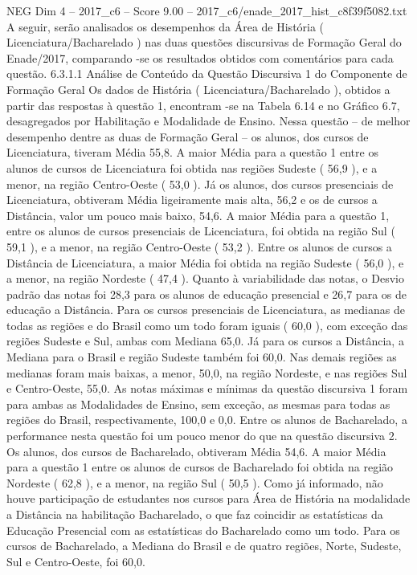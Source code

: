 \begin{textsample}{NEG Dim 4 – 2017\_c6 – Score 9.00 – 2017\_c6/enade\_2017\_hist\_c8f39f5082.txt}
A seguir, serão analisados os desempenhos da Área de História ( Licenciatura/Bacharelado ) nas duas questões discursivas de Formação Geral do Enade/2017, comparando -se os resultados obtidos com comentários para cada questão. 6.3.1.1 Análise de Conteúdo da Questão Discursiva 1 do Componente de Formação Geral Os dados de História ( Licenciatura/Bacharelado ), obtidos a partir das respostas à questão 1, encontram -se na Tabela 6.14 e no Gráfico 6.7, desagregados por Habilitação e Modalidade de Ensino.
Nessa questão – de melhor desempenho dentre as duas de Formação Geral – os alunos, dos cursos de Licenciatura, tiveram Média 55,8.
A maior Média para a questão 1 entre os alunos de cursos de Licenciatura foi obtida nas regiões Sudeste ( 56,9 ), e a menor, na região Centro-Oeste ( 53,0 ).
Já os alunos, dos cursos presenciais de Licenciatura, obtiveram Média ligeiramente mais alta, 56,2 e os de cursos a Distância, valor um pouco mais baixo, 54,6.
A maior Média para a questão 1, entre os alunos de cursos presenciais de Licenciatura, foi obtida na região Sul ( 59,1 ), e a menor, na região Centro-Oeste ( 53,2 ).
Entre os alunos de cursos a Distância de Licenciatura, a maior Média foi obtida na região Sudeste ( 56,0 ), e a menor, na região Nordeste ( 47,4 ).
Quanto à variabilidade das notas, o Desvio padrão das notas foi 28,3 para os alunos de educação presencial e 26,7 para os de educação a Distância.
Para os cursos presenciais de Licenciatura, as medianas de todas as regiões e do Brasil como um todo foram iguais ( 60,0 ), com exceção das regiões Sudeste e Sul, ambas com Mediana 65,0.
Já para os cursos a Distância, a Mediana para o Brasil e região Sudeste também foi 60,0.
Nas demais regiões as medianas foram mais baixas, a menor, 50,0, na região Nordeste, e nas regiões Sul e Centro-Oeste, 55,0.
As notas máximas e mínimas da questão discursiva 1 foram para ambas as Modalidades de Ensino, sem exceção, as mesmas para todas as regiões do Brasil, respectivamente, 100,0 e 0,0.
Entre os alunos de Bacharelado, a performance nesta questão foi um pouco menor do que na questão discursiva 2.
Os alunos, dos cursos de Bacharelado, obtiveram Média 54,6.
A maior Média para a questão 1 entre os alunos de cursos de Bacharelado foi obtida na região Nordeste ( 62,8 ), e a menor, na região Sul ( 50,5 ).
Como já informado, não houve participação de estudantes nos cursos para Área de História na modalidade a Distância na habilitação Bacharelado, o que faz coincidir as estatísticas da Educação Presencial com as estatísticas do Bacharelado como um todo.
Para os cursos de Bacharelado, a Mediana do Brasil e de quatro regiões, Norte, Sudeste, Sul e Centro-Oeste, foi 60,0.

\end{textsample}
